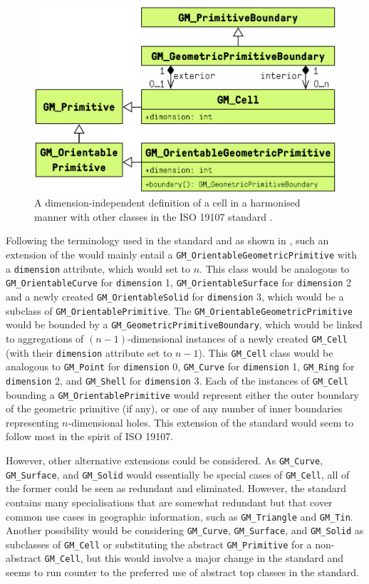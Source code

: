 \begin{figure}
\centering
  \includegraphics[width=0.7\linewidth]{figs/iso-cell-brep}
  \caption[A dimension-independent cell harmonised with ISO 19107]{A dimension-independent definition of a cell in a harmonised manner with other classes in the ISO 19107 standard \citep{ISO19107:2005}.}
\label{fig:iso-cell-brep}
\end{figure}

Following the terminology used in the standard and as shown in , such an extension of the would mainly entail a \texttt{GM\_OrientableGeometricPrimitive} with a \texttt{dimension} attribute, which would set to $n$.
This class would be analogous to \texttt{GM\_OrientableCurve} for \texttt{dimension} 1, \texttt{GM\_OrientableSurface} for \texttt{dimension} 2 and a newly created \texttt{GM\_OrientableSolid} for \texttt{dimension} 3, which would be a subclass of \texttt{GM\_OrientablePrimitive}.
The \texttt{GM\_OrientableGeometricPrimitive} would be bounded by a \texttt{GM\_GeometricPrimitiveBoundary}, which would be linked to aggregations of $(n-1)$-dimensional instances of a newly created \texttt{GM\_Cell} (with their \texttt{dimension} attribute set to $n-1$).
This \texttt{GM\_Cell} class would be analogous to \texttt{GM\_Point} for \texttt{dimension} 0, \texttt{GM\_Curve} for \texttt{dimension} 1, \texttt{GM\_Ring} for \texttt{dimension} 2, and \texttt{GM\_Shell} for \texttt{dimension} 3.
Each of the instances of \texttt{GM\_Cell} bounding a \texttt{GM\_OrientablePrimitive} would represent either the outer boundary of the geometric primitive (if any), or one of any number of inner boundaries representing $n$-dimensional holes.
This extension of the standard would seem to follow most in the spirit of ISO 19107.

However, other alternative extensions could be considered.
As \texttt{GM\_Curve}, \texttt{GM\_Surface}, and \texttt{GM\_Solid} would essentially be special cases of \texttt{GM\_Cell}, all of the former could be seen as redundant and eliminated.
However, the standard contains many specialisations that are somewhat redundant but that cover common use cases in geographic information, such as \texttt{GM\_Triangle} and \texttt{GM\_Tin}.
Another possibility would be considering \texttt{GM\_Curve}, \texttt{GM\_Surface}, and \texttt{GM\_Solid} as subclasses of \texttt{GM\_Cell} or substituting the abstract \texttt{GM\_Primitive} for a non-abstract \texttt{GM\_Cell}, but this would involve a major change in the standard and seems to run counter to the preferred use of abstract top classes in the standard.

